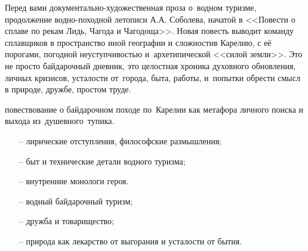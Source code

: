 
\clearpage               %
\thispagestyle{plain}   %


{\small%
\vspace{2mm}
\setlength{\parskip}{2mm}
\setlength{\parindent}{1.0cm}
Перед вами документально-художественная проза о~водном туризме, продолжение водно-походной летописи А.А. Соболева, начатой в <<Повести о сплаве по рекам Лидь, Чагода и Чагодоща>>. Новая повесть выводит команду сплавщиков в пространство иной географии и сложности\mdash в Карелию, с её порогами, погодной неуступчивостью и~архетипической <<силой земли>>. Это не просто байдарочный дневник, это целостная хроника духовного обновления, личных кризисов, усталости от~города, быта, работы, и~попытки обрести смысл в природе, дружбе, простом труде.

\mdash повествование о байдарочном походе по~Карелии как метафора личного поиска и выхода из~душевного~тупика.

\begin{enumerate}[leftmargin=1cm, itemsep=0pt, topsep=0pt] %
	\item[--] лирические отступления, философские размышления;
	\item[--] быт и технические детали водного туризма;
	\item[--] внутренние монологи героя.
\end{enumerate}

\begin{enumerate}[leftmargin=1cm, itemsep=0pt, topsep=0pt]
	\item[--] водный байдарочный туризм;	
	\item[--] дружба и товарищество;	
	\item[--] природа как лекарство от выгорания и усталости от бытия.
\end{enumerate}

}
